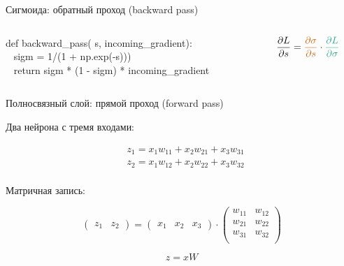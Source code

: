 \documentclass[notes,12pt, aspectratio=169]{beamer}
\newenvironment{wideitemize}{\itemize\addtolength{\itemsep}{10pt}}{\enditemize}
\begin{document}
\begin{frame}{Сигмоида: обратный проход (backward pass)}
\begin{columns}
	\begin{column}{.69\textwidth}
		{\color{green} def}  {\color{blue} backward\_pass}({\color{amethyst} s}, {\color{junglegreen} incoming\_gradient}):  \\
		\mbox{ } \hspace{5mm} { sigm =  1/(1 + np.exp({\color{amethyst}-s}))}) \\
		\mbox{ } \hspace{5mm} {\color{green} return }  {\color{red} sigm * (1 - sigm) } *  {\color{junglegreen} incoming\_gradient}
	\end{column}
	\begin{column}{.29\textwidth}
		\[  \frac{ \partial L}{\partial s}  = {\color{red}  \frac{ \partial \sigma}{\partial s} } \cdot {\color{junglegreen} \frac{ \partial L}{\partial \sigma} }   \]
	\end{column}
\end{columns}
\end{frame} 


\begin{frame}{Полносвязный слой: прямой проход (forward pass)}
\begin{wideitemize}
\item Два нейрона с тремя входами:

\begin{equation*}
\begin{aligned}
	& z_1 = x_1 w_{11} + x_2 w_{21} + x_3 w_{31}  \\  
	& z_2 = x_1 w_{12} + x_2 w_{22} + x_3 w_{32}  \\  
\end{aligned}
\end{equation*}

\item Матричная запись: 

\begin{equation*}
	\begin{pmatrix} z_1 & z_2 \end{pmatrix}  = \begin{pmatrix} x_1 & x_2 & x_3  \end{pmatrix}  \cdot  \begin{pmatrix} w_{11} & w_{12} \\ w_{21} & w_{22} \\ w_{31}  & w_{32} \\  \end{pmatrix}
\end{equation*}

\[ 
	z  = x W 
\]

\end{wideitemize}
\end{frame}
\end{document}
